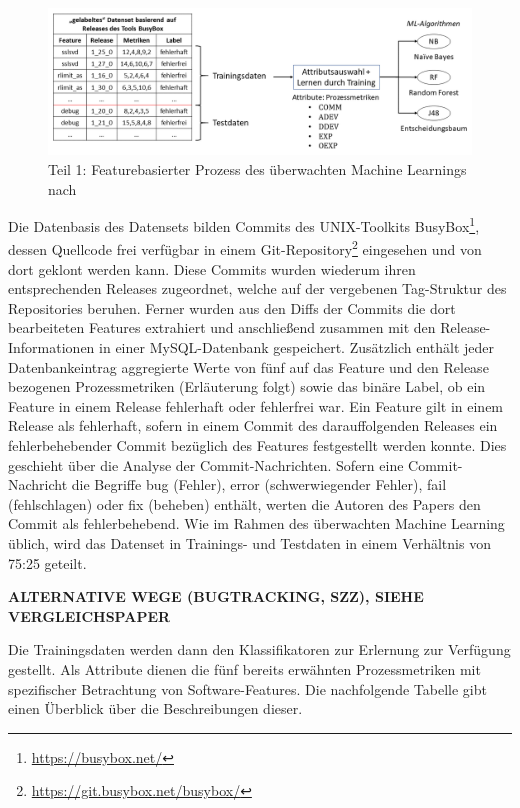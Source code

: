 \begin{figure}[H]
    \centering
    \captionsetup{justification=centering}
    \includegraphics[width=\textwidth]{images/ML1}
    \caption{Teil 1: Featurebasierter Prozess des überwachten Machine Learnings nach \cite{Queiroz2016}}\label{fig:ml1}
\end{figure}

Die Datenbasis des Datensets bilden Commits des UNIX-Toolkits BusyBox\footnote{\url{https://busybox.net/}}, dessen Quellcode frei verfügbar in einem Git-Repository\footnote{\url{https://git.busybox.net/busybox/}} eingesehen und von dort geklont werden kann. Diese Commits wurden wiederum ihren entsprechenden Releases zugeordnet, welche auf der vergebenen Tag-Struktur des Repositories beruhen. Ferner wurden aus den Diffs der Commits die dort bearbeiteten Features extrahiert und anschließend zusammen mit den Release-Informationen in einer MySQL-Datenbank gespeichert. Zusätzlich enthält jeder Datenbankeintrag aggregierte Werte von fünf auf das Feature und den Release bezogenen Prozessmetriken (Erläuterung folgt) sowie das binäre Label, ob ein Feature in einem Release fehlerhaft oder fehlerfrei war. Ein Feature gilt in einem Release als fehlerhaft, sofern in einem Commit des darauffolgenden Releases ein fehlerbehebender Commit bezüglich des Features festgestellt werden konnte. Dies geschieht über die Analyse der Commit-Nachrichten. Sofern eine Commit-Nachricht die Begriffe \glqq bug\grqq{} (Fehler), \glqq error\grqq{} (schwerwiegender Fehler), \glqq fail\grqq{} (fehlschlagen) oder \glqq fix\grqq{} (beheben) enthält, werten die Autoren des Papers den Commit als fehlerbehebend. Wie im Rahmen des überwachten Machine Learning üblich, wird das Datenset in Trainings- und Testdaten in einem Verhältnis von 75:25 geteilt. 

\textbf{ALTERNATIVE WEGE (BUGTRACKING, SZZ), SIEHE VERGLEICHSPAPER}

Die Trainingsdaten werden dann den Klassifikatoren zur Erlernung zur Verfügung gestellt. Als Attribute dienen die fünf bereits erwähnten Prozessmetriken mit spezifischer Betrachtung von Software-Features. Die nachfolgende Tabelle gibt einen Überblick über die Beschreibungen dieser.

